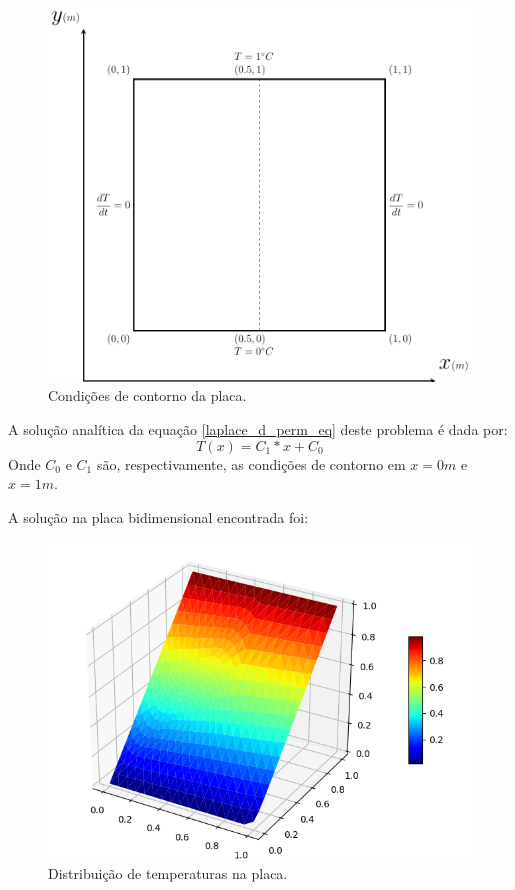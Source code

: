 \begin{figure}[!ht]
    \centering
    \includegraphics[width=.7\linewidth]{figures/laplace_dirichlet_boundary_conditions.pdf}
    \caption{Condições de contorno da placa.}
    \label{laplace_d_perm_bc}
\end{figure}

A solução analítica da equação \ref{laplace_d_perm_eq} deste problema é dada por:
\begin{equation}
    T(x) = C_1*x + C_0
    \label{laplace_d_perm_sol}
\end{equation}
Onde $C_0$ e $C_1$ são, respectivamente, as condições de contorno em $x=0m$ e $x=1m$.

A solução na placa bidimensional encontrada foi:
\begin{figure}[!ht]
    \centering
    \includegraphics[width=.7\linewidth]{figures/laplace_dirichlet_permanent_3d.png}
    \caption{Distribuição de temperaturas na placa.}
    \label{laplace_d_perm_3d}
\end{figure}

